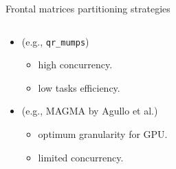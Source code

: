 \begin{frame}{Frontal matrices partitioning strategies}
  \begin{columns}    
    \begin{column}{0.7\textwidth}
      \begin{itemize}
      \item<1-> (e.g., \texttt{qr\_mumps})
        \begin{itemize}
        \item<2->[\dg{$\blacktriangle$}]     high concurrency.
        \item<2->[\dr{$\blacktriangledown$}] low tasks efficiency.
        \end{itemize}
      \end{itemize}
      \begin{itemize}

      \item<3-> (e.g., MAGMA by Agullo et al.)

        \vspace{-0.2cm}

        \begin{itemize}
        \item<4->[\dg{$\blacktriangle$}]     optimum granularity for GPU. 
        \item<4->[\dr{$\blacktriangledown$}] limited concurrency. %
        \end{itemize}
      \end{itemize}


\end{column}
\end{columns}
\end{frame}
